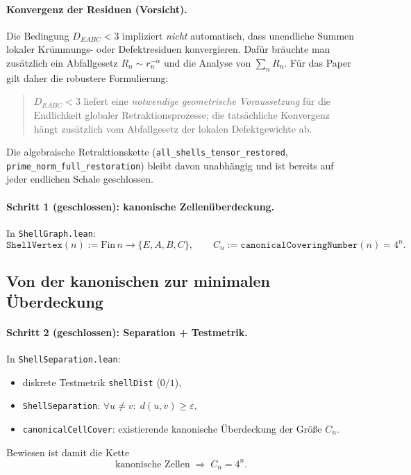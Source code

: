 \documentclass[11pt,a4paper]{article}
\begin{document}
	\paragraph{Konvergenz der Residuen (Vorsicht).}
	Die Bedingung $D_{EABC}<3$ impliziert \emph{nicht} automatisch, dass unendliche
	Summen lokaler Krümmungs- oder Defektresiduen konvergieren.
	Dafür bräuchte man zusätzlich ein Abfallgesetz $R_n\sim r_n^{-\alpha}$ und die
	Analyse von $\sum_n R_n$.
	Für das Paper gilt daher die robustere Formulierung:
	\begin{quote}
		$D_{EABC}<3$ liefert eine \emph{notwendige geometrische Voraussetzung} für die
		Endlichkeit globaler Retraktionsprozesse; die tatsächliche Konvergenz hängt
		zusätzlich vom Abfallgesetz der lokalen Defektgewichte ab.
	\end{quote}
	Die algebraische Retraktionskette (\texttt{all\_shells\_tensor\_restored},
	\texttt{prime\_norm\_full\_restoration}) bleibt davon unabhängig und ist
	bereits auf jeder endlichen Schale geschlossen.
	
	\paragraph{Schritt 1 (geschlossen): kanonische Zellenüberdeckung.}
	In \texttt{ShellGraph.lean}:
	\[
	\texttt{ShellVertex}(n) := \mathrm{Fin}\,n\to\{E,A,B,C\},
	\qquad
	C_n := \texttt{canonicalCoveringNumber}(n)=4^n.
	\]
	
	\subsection{Von der kanonischen zur minimalen Überdeckung}
	\label{sec:canonical-to-minimal}
	
	\paragraph{Schritt 2 (geschlossen): Separation + Testmetrik.}
	In \texttt{ShellSeparation.lean}:
	\begin{itemize}
		\item diskrete Testmetrik \texttt{shellDist} ($0/1$),
		\item \texttt{ShellSeparation}: $\forall u\neq v:\; d(u,v)\ge\varepsilon$,
		\item \texttt{canonicalCellCover}: existierende kanonische Überdeckung der Größe $C_n$.
	\end{itemize}
	Bewiesen ist damit die Kette
	\[
	\text{kanonische Zellen}
	\;\Longrightarrow\;
	C_n = 4^n.
	\]
	
\end{document}
